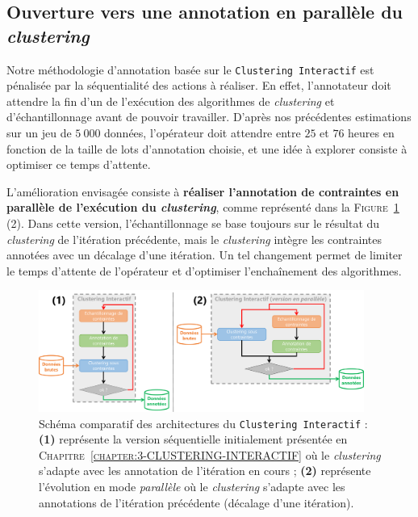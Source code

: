		\subsection{Ouverture vers une annotation en parallèle du \textit{clustering}}
		
			Notre méthodologie d'annotation basée sur le \texttt{Clustering Interactif} est pénalisée par la séquentialité des actions à réaliser.
			En effet, l'annotateur doit attendre la fin d'un de l'exécution des algorithmes de \textit{clustering} et d'échantillonnage avant de pouvoir travailler.
			D'après nos précédentes estimations sur un jeu de $5~000$ données, l'opérateur doit attendre entre $25$ et $76$ heures en fonction de la taille de lots d'annotation choisie, et une idée à explorer consiste à optimiser ce temps d'attente.
			
			L'amélioration envisagée consiste à \textbf{réaliser l'annotation de contraintes en parallèle de l'exécution du \textit{clustering}}, comme représenté dans la \textsc{Figure~\ref{figure:4.3.4-ETUDE-COUT-TOTAL-ARCHITECTURE}} (2).
			Dans cette version, l'échantillonnage se base toujours sur le résultat du \textit{clustering} de l'itération précédente, mais le \textit{clustering} intègre les contraintes annotées avec un décalage d'une itération.
			Un tel changement permet de limiter le temps d'attente de l'opérateur et d'optimiser l'enchaînement des algorithmes.

			\begin{figure}[!htb]
				\centering
				\includegraphics[width=0.95\textwidth]{figures/interactive-clustering-architecture-sequentielle-vs-parallele}
				\caption{
					Schéma comparatif des architectures du \texttt{Clustering Interactif} : \textbf{(1)} représente la version séquentielle initialement présentée en \textsc{Chapitre~\ref{chapter:3-CLUSTERING-INTERACTIF}} où le \textit{clustering} s'adapte avec les annotation de l'itération en cours ; \textbf{(2)} représente l'évolution en mode \textit{parallèle} où le \textit{clustering} s'adapte avec les annotations de l'itération précédente (décalage d'une itération).
				}
				\label{figure:4.3.4-ETUDE-COUT-TOTAL-ARCHITECTURE}
			\end{figure}
			

